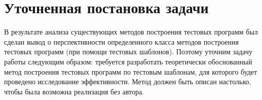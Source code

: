 %
%


\section{Уточненная постановка задачи}\label{sec:problem_refinement}

В результате анализа существующих методов построения тестовых программ был сделан вывод о перспективности определенного класса методов построения тестовых программ (при помощи тестовых шаблонов). Поэтому уточним задачу работы следующим образом: требуется разработать теоретически обоснованный метод построения тестовых программ по тестовым шаблонам, для которого будет проведено исследование эффективности. Метод должен быть описан настолько, чтобы была возможна реализация без автора.

%

